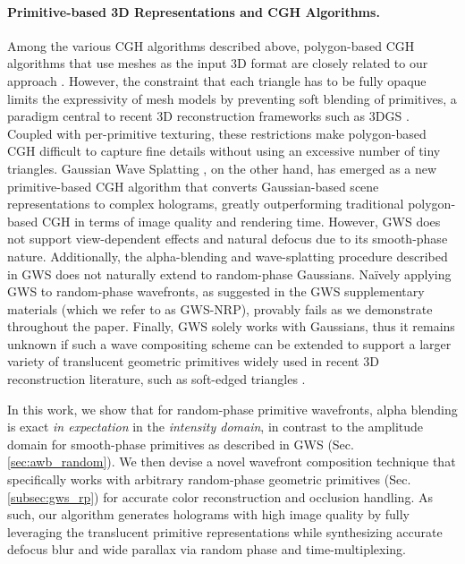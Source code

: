 \paragraph{\bf{Primitive-based 3D Representations and CGH Algorithms.}} Among the various CGH algorithms described above, polygon-based CGH algorithms that use meshes as the input 3D format are closely related to our approach \cite{matsushima2005computer, matsushima2005exact, matsushima2009extremely, askari2017occlusion, chen2009computer, matsushima2018full, matsushima2014silhouette}. However, the constraint that each triangle has to be fully opaque limits the expressivity of mesh models by preventing soft blending of primitives, a paradigm central to recent 3D reconstruction frameworks such as 3DGS \cite{kerbl3Dgaussians}. Coupled with per-primitive texturing, these restrictions make polygon-based CGH difficult to capture fine details without using an excessive number of tiny triangles. Gaussian Wave Splatting \cite{choi2025gaussian}, on the other hand, has emerged as a new primitive-based CGH algorithm that converts Gaussian-based scene representations \cite{kerbl3Dgaussians, huang20242d} to complex holograms, greatly outperforming traditional polygon-based CGH in terms of image quality and rendering time. However, GWS does not support view-dependent effects and natural defocus due to its smooth-phase nature. Additionally, the alpha-blending and wave-splatting procedure described in GWS does not naturally extend to random-phase Gaussians. Na\"ively applying GWS to random-phase wavefronts, as suggested in the GWS supplementary materials (which we refer to as GWS-NRP), provably fails as we demonstrate throughout the paper. Finally, GWS solely works with Gaussians, thus it remains unknown if such a wave compositing scheme can be extended to support a larger variety of translucent geometric primitives widely used in recent 3D reconstruction literature, such as soft-edged triangles \cite{Held2025Triangle, sheng20252dtrianglesplattingdirect, burgdorfer2025radianttrianglesoupsoft}.

In this work, we show that for random-phase primitive wavefronts, alpha blending is exact \textit{in expectation} in the \textit{intensity domain}, in contrast to the amplitude domain for smooth-phase primitives as described in GWS (Sec. \ref{sec:awb_random}). We then devise a novel wavefront composition technique that specifically works with arbitrary random-phase geometric primitives (Sec. \ref{subsec:gws_rp}) for accurate color reconstruction and occlusion handling. As such, our algorithm generates holograms with high image quality by fully leveraging the translucent primitive representations while synthesizing accurate defocus blur and wide parallax via random phase and time-multiplexing.
